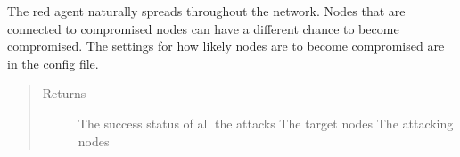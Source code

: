 \documentclass[letterpaper,10pt,english]{sphinxmanual}
\begin{document}
\begin{fulllineitems}
\begin{fulllineitems}
\begin{quote}
\begin{description}
\end{description}\end{quote}

\end{fulllineitems}


\begin{fulllineitems}
\label{\detokenize{source/yawning_titan.envs.generic.core:yawning_titan.envs.generic.core.red_action_set.RedActionSet.natural_spread}}
\sphinxAtStartPar
The red agent naturally spreads throughout the network. Nodes that are connected to compromised nodes can have
a different chance to become compromised. The settings for how likely nodes are to become compromised are in
the config file.
\begin{quote}\begin{description}
\item[{Returns}] \leavevmode
\sphinxAtStartPar
The success status of all the attacks
The target nodes
The attacking nodes

\end{description}\end{quote}

\end{fulllineitems}


\begin{fulllineitems}
\label{\detokenize{source/yawning_titan.envs.generic.core:yawning_titan.envs.generic.core.red_action_set.RedActionSet.node_set}}
\end{fulllineitems}



\end{fulllineitems}
\end{document}
